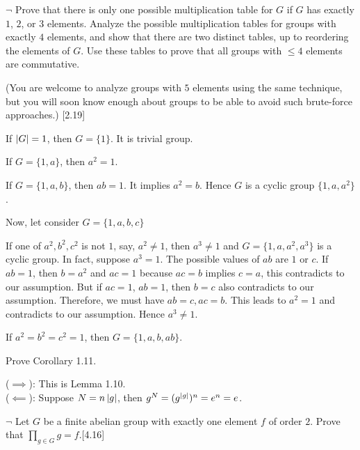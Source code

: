 \begin{problem}[1.6]
$\neg$ Prove that there is only one possible multiplication table for $G$ if $G$ has
exactly $1$, $2$, or $3$ elements. Analyze the possible multiplication tables for groups
with exactly $4$ elements, and show that there are two distinct tables, up to reordering
the elements of $G$. Use these tables to prove that all groups with $\leq 4$ elements are commutative.

(You are welcome to analyze groups with $5$ elements using the same technique,
but you will soon know enough about groups to be able to avoid such brute-force
approaches.) [2.19]
\end{problem}

\begin{solution}
If $\left|G\right|=1$, then $G=\{1\}$. It is trivial group.

\noindent If $G=\{1, a\}$, then $a^2=1$. 

\noindent If $G=\{1, a, b\}$, then $ab=1$. It implies $a^2=b$. Hence $G$ is a cyclic group $\{1, a, a^2\}$. 

\noindent Now, let consider $G=\{1,a,b,c\}$
	
	If one of $a^2, b^2, c^2$ is not $1$, say, $a^2\neq 1$, then $a^3\neq 1$ and $G=\{1,a,a^2, a^3\}$ is a cyclic group. In fact, suppose $a^3=1$. 
	The possible values of $ab$ are $1$ or $c$. If $ab=1$, then $b=a^2$ and $ac=1$ because $ac=b$ implies $c=a$, this contradicts to our assumption. But if $ac=1$, $ab=1$, then $b=c$ also contradicts to our assumption. 
Therefore, we must have $ab=c, ac=b$. This leads to $a^2=1$ and contradicts to our assumption. Hence $a^3\neq 1$.

If $a^2=b^2=c^2=1$, then $G=\{1, a, b, ab\}$.
\end{solution}

\begin{problem}[1.7]
Prove Corollary 1.11.
\end{problem}

\begin{solution}
($\implies$): This is Lemma 1.10.\\
($\impliedby$): Suppose $N=n\left|g\right|$, then $g^N = (g^{\left|g\right|})^n = e^n=e$.
\end{solution}

\begin{problem}[1.8]
$\neg$ Let $G$ be a finite abelian group with exactly one element $f$ of order $2$. Prove
that $\prod_{g\in G}g=f$.[4.16]
\end{problem}

